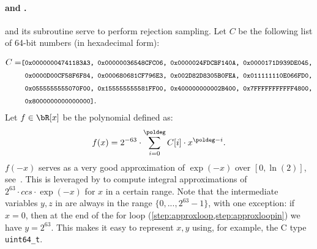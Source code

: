\begin{algorithm}[!htb]
	\caption{$\basesampler()$}\label{alg:basesampler}
	\begin{algorithmic}[1]
		\Require {-}
		 
		\label{line:basesampler} 
		 
		\EndFor
	\end{algorithmic}
\end{algorithm}



\paragraph{\berexp and \approxexp.} \longberexp and its subroutine \longapproxexp serve to perform rejection sampling. Let $C$ be the following list of 64-bit numbers (in hexadecimal form):

\begin{align*}
C = & \footnotesize{\texttt{%
	[0x00000004741183A3, 0x00000036548CFC06, 0x0000024FDCBF140A, 0x0000171D939DE045,}} \\
	& \footnotesize{\texttt{%
	\ 0x0000D00CF58F6F84, 0x000680681CF796E3, 0x002D82D8305B0FEA, 0x011111110E066FD0,}}\\%
	& \footnotesize{\texttt{%
	\ 0x0555555555070F00, 0x155555555581FF00, 0x400000000002B400, 0x7FFFFFFFFFFF4800,}}\\%
	& \footnotesize{\texttt{%
	\ 0x8000000000000000]}}.%
\end{align*}
Let $f \in \bR[x]$ be the polynomial defined as:
$$f(x) = 2^{-63} \cdot \sum_{i=0}^{\poldeg} C[i] \cdot x^{\poldeg - i}.$$
$f(-x)$ serves as a very good approximation of $\exp(-x)$ over $[0, \ln(2)]$, see~\cite{TC:ZhaSteSak20}. This is leveraged by \longapproxexp to compute integral approximations of $2^{63} \cdot ccs \cdot \exp(-x)$ for $x$ in a certain range. Note that the intermediate variables $y, z$ in \approxexp are always in the range $\{0, ..., 2^{63} - 1\}$, with one exception: if $x = 0$, then at the end of the for loop (\cref{step:approxloop,step:approxloopin}) we have $y = 2^{63}$. This makes it easy to represent $x,y$ using, for example, the C type \verb+uint64_t+. 


